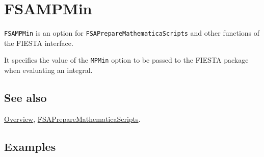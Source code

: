 \documentclass[../FeynHelpersManual.tex]{subfiles}
\begin{document}
\hypertarget{fsampmin}{
\section{FSAMPMin}\label{fsampmin}}

\texttt{FSAMPMin} is an option for \texttt{FSAPrepareMathematicaScripts}
and other functions of the FIESTA interface.

It specifies the value of the \texttt{MPMin} option to be passed to the
FIESTA package when evaluating an integral.

\subsection{See also}

\hyperlink{toc}{Overview},
\hyperlink{fsapreparemathematicascripts}{FSAPrepareMathematicaScripts}.

\subsection{Examples}
\end{document}
